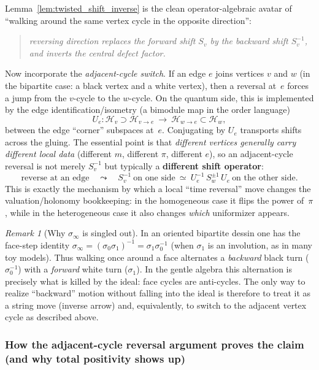 \documentclass[11pt,oneside]{amsbook}
\numberwithin{equation}{section}
\theoremstyle{plain}
\theoremstyle{definition}
\theoremstyle{remark}
\newtheorem{remark}[theorem]{Remark}
\newcommand{\cH}{\mathcal{H}}
\begin{document}
\begin{enumerate}
Lemma~\ref{lem:twisted_shift_inverse} is the clean operator-algebraic avatar of ``walking around the same vertex cycle in the opposite direction'':
\begin{quote}
\emph{reversing direction replaces the forward shift $S_v$ by the backward shift $S_v^{-1}$, and inverts the central defect factor.}
\end{quote}

Now incorporate the \emph{adjacent-cycle switch}.
If an edge $e$ joins vertices $v$ and $w$ (in the bipartite case: a black vertex and a white vertex), then a reversal at~$e$
forces a jump from the $v$-cycle to the $w$-cycle.
On the quantum side, this is implemented by the edge identification/isometry (a bimodule map in the order language)
\[
U_e:\cH_v\supset \cH_{v\to e}\ \longrightarrow\ \cH_{w\to e}\subset \cH_w,
\]
between the edge ``corner'' subspaces at~$e$.
Conjugating by $U_e$ transports shifts across the gluing.
The essential point is that \emph{different vertices generally carry different local data} (different $m$, different $\pi$, different $e$),
so an adjacent-cycle reversal is not merely $S_v^{-1}$ but typically a \textbf{different shift operator}:
\[
\text{reverse at an edge} \quad\leadsto\quad
S_v^{-1}\ \text{on one side}\ \simeq\ U_e^{-1}\,S_w^{\pm 1}\,U_e\ \text{on the other side}.
\]
This is exactly the mechanism by which a local ``time reversal'' move changes the valuation/holonomy bookkeeping:
in the homogeneous case it flips the power of~$\pi$, while in the heterogeneous case it also changes \emph{which} uniformizer appears.

\begin{remark}[Why $\sigma_\infty$ is singled out]
In an oriented bipartite dessin one has the face-step identity
$\sigma_\infty=(\sigma_0\sigma_1)^{-1}=\sigma_1\sigma_0^{-1}$ (when $\sigma_1$ is an involution, as in many toy models).
Thus walking once around a face alternates a \emph{backward} black turn ($\sigma_0^{-1}$) with a \emph{forward} white turn ($\sigma_1$).
In the gentle algebra this alternation is precisely what is killed by the ideal: face cycles are anti-cycles.
The only way to realize ``backward'' motion without falling into the ideal is therefore to treat it as a string move (inverse arrow) and, equivalently, to switch to the adjacent vertex cycle as described above.
\end{remark}

\subsubsection{How the adjacent-cycle reversal argument proves the claim (and why total positivity shows up)}
\label{sec:how_reversal_proves_it}


\end{enumerate}
\end{document}
